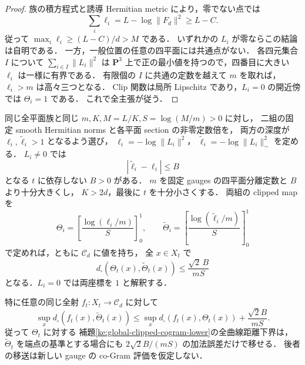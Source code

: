 \begin{proof}
族の積方程式と誘導 Hermitian metric により，零でない点では
\[
 \sum_i\ell_i=L-\log\|F_d\|^2\ge L-C.
\]
従って $\max_i\ell_i\ge(L-C)/d>M$ である．
いずれかの $L_i$ が零ならこの結論は自明である．
一方，一般位置の任意の四平面には共通点がない．
各四元集合 $I$ について $\sum_{i\in I}\|L_i\|^2$ は
$\mathbf P^3$ 上で正の最小値を持つので，四番目に大きい $\ell_i$ は一様に有界である．
有限個の $I$ に共通の定数を越えて $m$ を取れば，$\ell_i>m$ は高々三つとなる．
Clip 関数は局所 Lipschitz であり，$L_i=0$ の開近傍では $\Theta_i=1$ である．
これで全主張が従う．
\end{proof}

\begin{lemma}
\label{ke:clipped-depth-gauge-stability}
同じ全平面族と同じ \(m,K,M=L/K,S=\log(M/m)>0\) に対し，
二組の固定 smooth Hermitian norms と各平面 section の非零定数倍を，
両方の深度が \(\ell_i,\widetilde\ell_i>1\) となるよう選び，
\(\ell_i=-\log\|L_i\|^2\)，
\(\widetilde\ell_i=-\log\|L_i\|_{\!\sim}^2\) を定める．
\(L_i\ne0\) では
\[
 |\widetilde\ell_i-\ell_i|\le B
\]
となる \(t\) に依存しない \(B>0\) がある．
\(m\) を固定 gauges の四平面分離定数と \(B\) より十分大きくし，
\(K>2d\)，最後に \(t\) を十分小さくする．
両組の clipped map を
\[
 \Theta_i=\left[\frac{\log(\ell_i/m)}S\right]_0^1,
 \qquad
 \widetilde\Theta_i=
       \left[\frac{\log(\widetilde\ell_i/m)}S\right]_0^1
\]
で定めれば，ともに \(\mathcal C_d\) に値を持ち，
全 \(x\in X_t\) で
\begin{equation}\label{ke:eq:clipped-depth-gauge-stability}
 d_\square(\Theta_t(x),\widetilde\Theta_t(x))
 \le\frac{\sqrt2\,B}{mS}
\end{equation}
となる．\(L_i=0\) では両座標を \(1\) と解釈する．

特に任意の同じ全射 \(f_t:X_t\to\mathcal C_d\) に対して
\[
 \sup_xd_\square(f_t(x),\widetilde\Theta_t(x))
 \le\sup_xd_\square(f_t(x),\Theta_t(x))
        +\frac{\sqrt2 B}{mS}.
\]
従って \(\Theta_t\) に対する
補題\ref{ke:global-clipped-cogram-lower}の全曲線距離下界は，
\(\widetilde\Theta_t\) を端点の基準とする場合にも
\(2\sqrt2 B/(mS)\) の加法誤差だけで移せる．
後者の移送は新しい gauge の co-Gram 評価を仮定しない．
\end{lemma}

